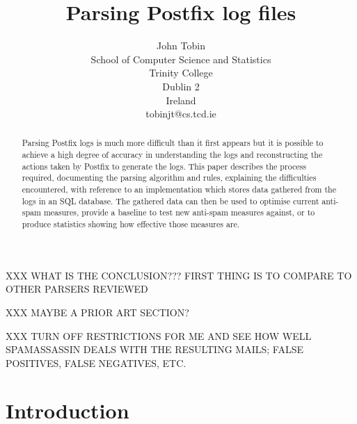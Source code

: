 \documentclass[a4paper,12pt,draft]{article}
\begin{document}
\title{Parsing Postfix log files}
\author{John Tobin \\ School of Computer Science and Statistics \\ 
Trinity College \\ Dublin 2 \\ Ireland \\ tobinjt@cs.tcd.ie}
\date{}
\maketitle

\begin{abstract}

    Parsing Postfix logs is much more difficult than it first appears but
    it is possible to achieve a high degree of accuracy in understanding
    the logs and reconstructing the actions taken by Postfix to generate
    the logs.  This paper describes the process required, documenting the
    parsing algorithm and rules, explaining the difficulties encountered,
    with reference to an implementation which stores data gathered from the
    logs in an SQL database.  The gathered data can then be used to
    optimise current anti-spam measures, provide a baseline to test new
    anti-spam measures against, or to produce statistics showing how
    effective those measures are.

\end{abstract}

XXX WHAT IS THE CONCLUSION???  FIRST THING IS TO COMPARE TO OTHER PARSERS
REVIEWED

XXX MAYBE A PRIOR ART SECTION\@?

XXX TURN OFF RESTRICTIONS FOR ME AND SEE HOW WELL SPAMASSASSIN DEALS WITH
THE RESULTING MAILS\@; FALSE POSITIVES, FALSE NEGATIVES, ETC\@.

\newpage
\tableofcontents

\newpage
\section{Introduction}

\label{introduction}
\end{document}
